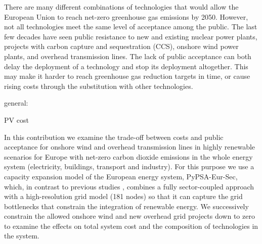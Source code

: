 There are many different combinations of technologies that would allow
the European Union to reach net-zero greenhouse gas emissions by
2050. However, not all technologies meet the same level of acceptance
among the public. The last few decades have seen public resistance to
new and existing nuclear power plants, projects with carbon capture
and sequestration (CCS), onshore wind power plants, and overhead
transmission lines. The lack of public acceptance can both delay the
deployment of a technology and stop its deployment altogether. This
may make it harder to reach greenhouse gas reduction targets in time,
or cause rising costs through the substitution with other
technologies.

general:
\cite{
    mckennaScenicnessAssessment2021,
    krummModellingSocial2022,
    weinandImpactPublic2021,
    weinandExploringTrilemma,
    trondleTradeOffsGeographic2020,
    sasseDistributionalTradeoffs2019,
    sasseRegionalImpacts2020,
    ludererImpactDeclining2021,
    EuropeanHydrogen,
    victoria2020,
    victoriaSpeedTechnological2021,
    lombardiPolicyDecision2020,
    tsiropoulosNetzeroEmissions2020,
    europeancommission.directorategeneralforenergy.METISStudy2021,
    deutschNoRegretHydrogen,
    tafarteQuantifyingTrade,
    lehmannManagingSpatial,
}

\cite{}

PV cost
\cite{jaxa-rozenSourcesUncertainty2021,victoriaSolarPhotovoltaics2021,xiaoPlummetingCosts2021}

In this contribution we examine the trade-off between costs and public
acceptance for onshore wind and overhead transmission lines in highly
renewable scenarios for Europe with net-zero carbon dioxide emissions
in the whole energy system (electricity, buildings, transport and
industry). For this purpose we use a capacity expansion model of the
European energy system, PyPSA-Eur-Sec, which, in contrast to previous
studies \cite{henningComprehensiveModel2014,mathiesenSmartEnergy2015,IEESWV,connollySmartEnergy2016,lofflerDesigningModel2017,blancoPotentialHydrogen2018,brownSynergiesSector2018,in-depth_2018,victoria2020},
combines a fully sector-coupled approach with a high-resolution grid
model (181 nodes) so that it can capture the grid bottlenecks that
constrain the integration of renewable energy.  We successively
constrain the allowed onshore wind and new overhead grid projects down
to zero to examine the effects on total system cost and the
composition of technologies in the system.

